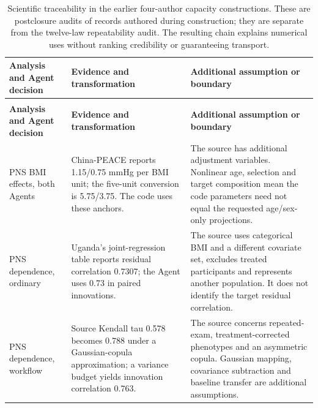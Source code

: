\documentclass[11pt,letterpaper]{article}
\begin{document}
\begin{xltabular}{\linewidth}{@{}>{\raggedright\arraybackslash}X>{\raggedright\arraybackslash}X>{\raggedright\arraybackslash}X@{}}

\caption{Scientific traceability in the earlier four-author capacity constructions. These are postclosure audits of records authored during construction; they are separate from the twelve-law repeatability audit. The resulting chain explains numerical uses without ranking credibility or guaranteeing transport.}\label{tab:6} \\

\toprule

\textbf{Analysis and Agent decision} & \textbf{Evidence and transformation} & \textbf{Additional assumption or boundary} \\

\midrule

\endfirsthead

\\

\toprule

\textbf{Analysis and Agent decision} & \textbf{Evidence and transformation} & \textbf{Additional assumption or boundary} \\

\midrule

\endhead

\bottomrule

\endfoot

PNS BMI effects, both Agents & China-PEACE reports 1.15/\allowbreak{}0.75 mmHg per BMI unit; the five-unit conversion is 5.75/\allowbreak{}3.75. The code uses these anchors. & The source has additional adjustment variables. Nonlinear age, selection and target composition mean the code parameters need not equal the requested age/\allowbreak{}sex-only projections. \\

PNS dependence, ordinary & Uganda's joint-regression table reports residual correlation 0.7307; the Agent uses 0.73 in paired innovations. & The source uses categorical BMI and a different covariate set, excludes treated participants and represents another population. It does not identify the target residual correlation. \\

PNS dependence, workflow & Source Kendall tau 0.578 becomes 0.788 under a Gaussian-copula approximation; a variance budget yields innovation correlation 0.763. & The source concerns repeated-exam, treatment-corrected phenotypes and an asymmetric copula. Gaussian mapping, covariance subtraction and baseline transfer are additional assumptions. \\


\end{xltabular}
\end{document}
